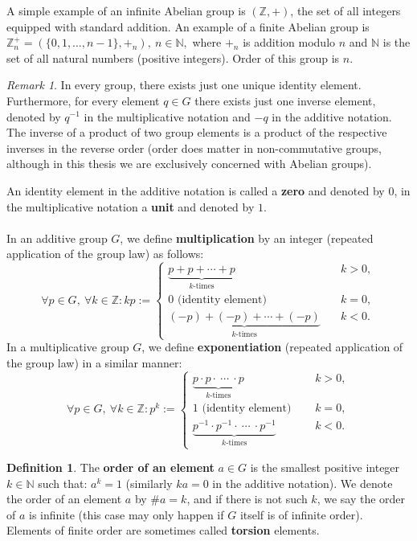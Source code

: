 \documentclass[thesis=M,english]{FITthesis}[2012/10/20]
\theoremstyle{remark}
\newtheorem*{RM}{Remark}
\theoremstyle{definition}
\newtheorem{DF}{Definition}[section]
\begin{document}
\noindent A simple example of an infinite Abelian group is $(\mathbb{Z}, +)$, the set of all integers equipped with standard addition. An example of a finite Abelian group is $\mathbb{Z}_n^+ = (\{0, 1, \ldots, n-1\}, +_{n}),\ n \in \mathbb{N},$ where $+_n$ is addition modulo $n$ and $\mathbb{N}$ is the set of all natural numbers (positive integers). Order of this group is $n$.
\begin{RM}
In every group, there exists just one unique identity element. Furthermore, for every element $q \in G$ there exists just one inverse element, denoted by $q^{-1}$ in the multiplicative notation and $-q$ in the additive notation. The inverse of a product of two group elements is a product of the respective inverses in the reverse order (order does matter in non-commutative groups, although in this thesis we are exclusively concerned with Abelian groups).
\end{RM}
\noindent An identity element in the additive notation is called a \textbf{zero} and denoted by $0$, in the multiplicative notation a \textbf{unit} and denoted by $1$. \\ \\
In an additive group $G$, we define \textbf{multiplication} by an integer (repeated application of the group law) as follows:
$$
\forall p \in G,\ \forall k \in \mathbb{Z}: kp := \begin{cases} \underbrace{p + p + \cdots + p}_{\text{$k$-times}} &\quad k > 0, \\
0 \text{ (identity element) } &\quad k = 0, \\
\underbrace{(-p) + (-p) + \cdots + (-p)}_{\text{$k$-times}} &\quad k < 0.
\end{cases}
$$
In a multiplicative group $G$, we define \textbf{exponentiation} (repeated application of the group law) in a similar manner:
$$
\forall p \in G,\ \forall k \in \mathbb{Z}: p^k := \begin{cases} \underbrace{p \cdot p \cdot\ \cdots\ \cdot  p}_{\text{$k$-times}} &\quad k > 0, \\
1 \text{ (identity element) } &\quad k = 0, \\
\underbrace{p^{-1} \cdot p^{-1} \cdot\ \cdots\ \cdot  p^{-1}}_{\text{$k$-times}} &\quad k < 0.
\end{cases}
$$
\begin{DF}
The \textbf{order of an element} $a \in G$ is the smallest positive integer $k \in \mathbb{N}$ such that: $a^k = 1$ (similarly $ka = 0$ in the additive notation). We denote the order of an element $a$ by $\#a= k$, and if there is not such $k$, we say the order of $a$ is infinite (this case may only happen if $G$ itself is of infinite order). Elements of finite order are sometimes called \textbf{torsion} elements.
\end{DF}
\end{document}
